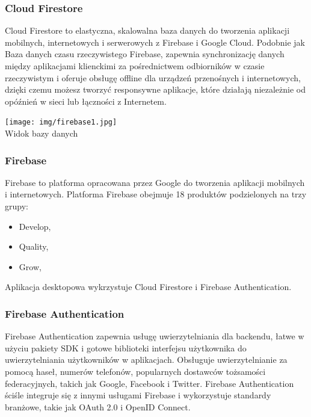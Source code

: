 \documentclass[12pt,a4paper]{article}
\begin{document}
		\subsubsection{Cloud Firestore}

					\indent	Cloud Firestore to elastyczna, skalowalna baza danych do tworzenia aplikacji mobilnych, internetowych i serwerowych z Firebase i Google Cloud.
					Podobnie jak Baza danych czasu rzeczywistego Firebase, zapewnia synchronizację danych między aplikacjami klienckimi za pośrednictwem odbiorników w czasie
					rzeczywistym i oferuje obsługę offline dla urządzeń przenośnych i internetowych, dzięki czemu możesz tworzyć responsywne aplikacje, które działają niezależnie
					od opóźnień w sieci lub łączności z Internetem.\\
					\begin{center}
					\texttt{[image: img/firebase1.jpg]}\\
						Widok bazy danych
					\end{center}
		\subsubsection{Firebase}

					\indent Firebase to platforma opracowana przez Google do tworzenia aplikacji mobilnych i internetowych. Platforma Firebase obejmuje 18 produktów podzielonych
					na trzy grupy:
					\begin{itemize}
						\item Develop,
						\item Quality,
						\item Grow,
					\end{itemize}
					Aplikacja desktopowa wykrzystuje Cloud Firestore i Firebase Authentication.
		\subsubsection{Firebase Authentication}

					\indent	Firebase Authentication zapewnia usługę uwierzytelniania dla backendu, łatwe w użyciu pakiety SDK i gotowe biblioteki interfejsu użytkownika
					do uwierzytelniania użytkowników w aplikacjach. Obsługuje uwierzytelnianie za pomocą haseł, numerów telefonów, popularnych dostawców tożsamości
					federacyjnych, takich jak Google, Facebook i Twitter. Firebase Authentication ściśle integruje się z innymi usługami Firebase i wykorzystuje standardy
					branżowe, takie jak OAuth 2.0 i OpenID Connect.								
					
\end{document}
